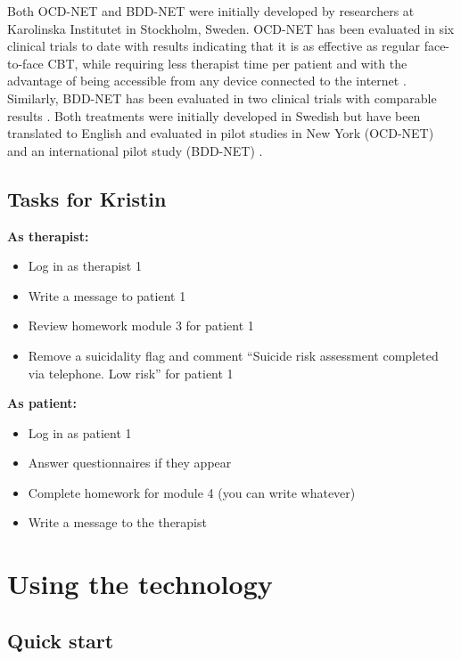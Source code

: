 \documentclass[]{book}
\providecommand{\tightlist}{%
  \setlength{\itemsep}{0pt}\setlength{\parskip}{0pt}}
\theoremstyle{definition}
\theoremstyle{definition}
\theoremstyle{definition}
\theoremstyle{remark}
\begin{document}
Both OCD-NET and BDD-NET were initially developed by researchers at
Karolinska Institutet in Stockholm, Sweden. OCD-NET has been evaluated
in six clinical trials to date with results indicating that it is as
effective as regular face-to-face CBT, while requiring less therapist
time per patient and with the advantage of being accessible from any
device connected to the internet
\citep{andersson2011a, andersson2012, andersson2014a, andersson2015a, ruck2018}.
Similarly, BDD-NET has been evaluated in two clinical trials with
comparable results \citep{enander2014, enander2016}. Both treatments
were initially developed in Swedish but have been translated to English
and evaluated in pilot studies in New York (OCD-NET) and an
international pilot study (BDD-NET) \citep{patel2017}.

\hypertarget{tasks-for-kristin}{%
\section{Tasks for Kristin}\label{tasks-for-kristin}}

\textbf{As therapist:}

\begin{itemize}
\tightlist
\item
  Log in as therapist 1
\item
  Write a message to patient 1
\item
  Review homework module 3 for patient 1
\item
  Remove a suicidality flag and comment ``Suicide risk assessment
  completed via telephone. Low risk'' for patient 1
\end{itemize}

\textbf{As patient:}

\begin{itemize}
\tightlist
\item
  Log in as patient 1
\item
  Answer questionnaires if they appear
\item
  Complete homework for module 4 (you can write whatever)
\item
  Write a message to the therapist
\end{itemize}

\hypertarget{using-the-technology}{%
\chapter{Using the technology}\label{using-the-technology}}

\hypertarget{quick-start}{%
\section{Quick start}\label{quick-start}}
\end{document}
